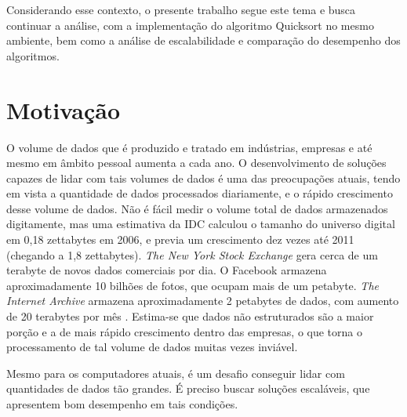 Considerando esse contexto, o presente trabalho segue este tema e busca continuar a análise, com a implementação do algoritmo Quicksort no mesmo ambiente, bem como a análise de escalabilidade e comparação do desempenho dos algoritmos.




\section{Motivação}


O volume de dados que é produzido e tratado em indústrias, empresas e até mesmo em âmbito pessoal aumenta a cada ano. O desenvolvimento de soluções capazes de lidar com tais volumes de dados é uma das preocupações atuais, tendo em vista a quantidade de dados processados diariamente, e o rápido crescimento desse volume de dados.
Não é fácil medir o volume total de dados armazenados digitamente, mas uma estimativa da IDC \cite{Gantz:2008} calculou o tamanho do universo digital em 0,18 zettabytes em 2006, e previa um crescimento dez vezes até 2011 (chegando a 1,8 zettabytes).
 \textit{The New York Stock Exchange} gera cerca de um terabyte de novos dados comerciais por dia. O Facebook armazena aproximadamente 10 bilhões de fotos, que ocupam mais de um petabyte. \textit{The Internet Archive} armazena aproximadamente 2 petabytes de dados, com aumento de 20 terabytes por mês
\cite{Hadoop:2010}. Estima-se que dados não estruturados são a maior porção e a de mais rápido crescimento dentro das empresas, o que torna o processamento de tal volume de dados muitas vezes inviável.

Mesmo para os computadores atuais, é um desafio conseguir lidar com quantidades de dados tão grandes. É preciso buscar soluções escaláveis, que apresentem bom desempenho em tais condições. 

